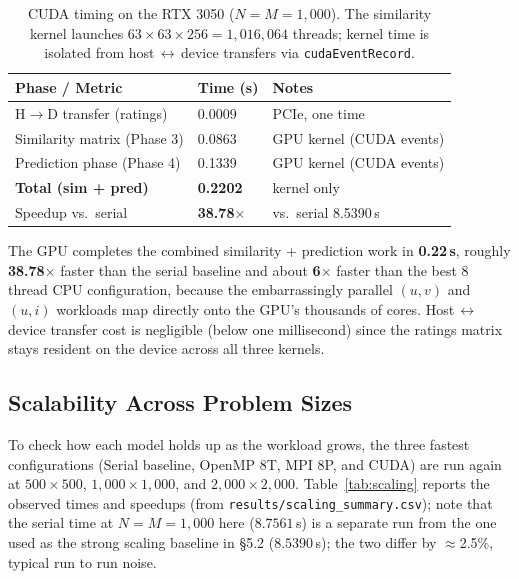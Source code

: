 \documentclass[11pt,a4paper]{article}
\newcommand{\code}[1]{\texttt{\small #1}}
\begin{document}
\begin{table}[!htbp]
\centering
\begin{tabular}{L{5cm} R{2.5cm} R{3cm}}
\toprule
\textbf{Phase / Metric} & \textbf{Time (s)} & \textbf{Notes} \\
\midrule
H$\rightarrow$D transfer (ratings) & 0.0009 & PCIe, one time \\
Similarity matrix (Phase 3) & 0.0863 & GPU kernel (CUDA events) \\
Prediction phase (Phase 4)  & 0.1339 & GPU kernel (CUDA events) \\
\textbf{Total (sim + pred)}  & \textbf{0.2202} & kernel only \\
\midrule
Speedup vs.\ serial          & \textbf{38.78$\times$} & vs.\ serial 8.5390\,s \\
\bottomrule
\end{tabular}
\caption{CUDA timing on the RTX 3050 ($N=M=1{,}000$). The similarity kernel
launches $63\times63\times256 = 1{,}016{,}064$ threads; kernel time is isolated
from host\,$\leftrightarrow$\,device transfers via \code{cudaEventRecord}.}
\end{table}

The GPU completes the combined similarity + prediction work in \textbf{0.22\,s},
roughly \textbf{38.78$\times$} faster than the serial baseline and about
\textbf{6$\times$} faster than the best 8 thread CPU configuration, because
the embarrassingly parallel $(u,v)$ and $(u,i)$ workloads map directly onto the
GPU's thousands of cores. Host\,$\leftrightarrow$\,device transfer cost is
negligible (below one millisecond) since the ratings matrix stays resident on the
device across all three kernels.

\subsection{Scalability Across Problem Sizes}\label{sec:scaling}

To check how each model holds up as the workload grows, the three fastest
configurations (Serial baseline, OpenMP 8T, MPI 8P, and CUDA) are run again at
$500\times500$, $1{,}000\times1{,}000$, and $2{,}000\times2{,}000$.
Table~\ref{tab:scaling} reports the observed times and speedups (from
\code{results/scaling\_summary.csv}); note that the serial time at
$N=M=1{,}000$ here ($8.7561$\,s) is a separate run from the one used as the
strong scaling baseline in §5.2 ($8.5390$\,s); the two differ by
$\approx$2.5\%, typical run to run noise.
\end{document}
